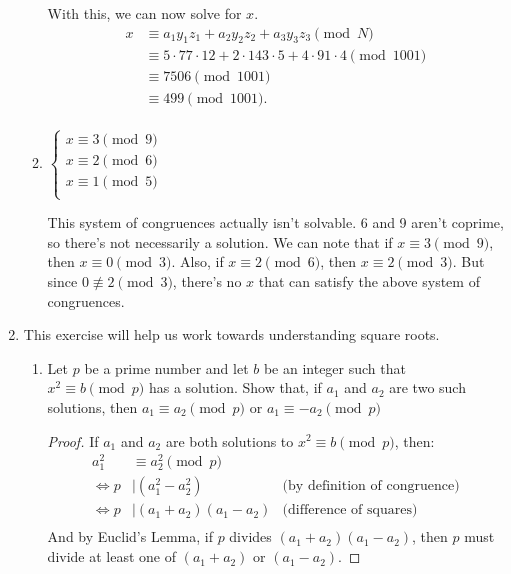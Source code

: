 \documentclass[11pt]{article}
\newcommand{\n}{\vspace{0.5cm}}
\begin{document}
\begin{enumerate}
\begin{enumerate}
          With this, we can now solve for \(x\).
          \begin{align*}
            x &\equiv a_1y_1z_1 + a_2y_2z_2 + a_3y_3z_3 \pmod{N} \\ 
              &\equiv 5 \cdot 77 \cdot 12 + 2 \cdot 143 \cdot 5 + 4 \cdot 91 \cdot 4 \pmod{1001} \\
              &\equiv 7506 \pmod{1001} \\
              &\equiv 499 \pmod{1001}. \\
          \end{align*}

        \item \(\begin{cases}
            x \equiv 3 \pmod{9} \\
            x \equiv 2 \pmod{6} \\
            x \equiv 1 \pmod{5} \\
          \end{cases}\) \n

          This system of congruences actually isn't solvable.  6 and 9 aren't coprime, so there's not necessarily a solution.  We can note that if \(x \equiv 3 \pmod 9\), then \(x \equiv 0 \pmod 3\).  Also, if \(x \equiv 2 \pmod 6\), then \(x \equiv 2 \pmod 3\).  But since \(0 \not\equiv 2 \pmod 3\), there's no \(x\) that can satisfy the above system of congruences.
      \end{enumerate}

    \item This exercise will help us work towards understanding square roots.
      \begin{enumerate}
        \item Let \(p\) be a prime number and let \(b\) be an integer such that \(x^2 \equiv b \pmod p\) has a solution.  Show that, if \(a_1\) and \(a_2\) are two such solutions, then \(a_1 \equiv a_2 \pmod p\) or \(a_1 \equiv -a_2 \pmod p\)
          \begin{proof}
            If \(a_1\) and \(a_2\) are both solutions to \(x^2 \equiv b \pmod p\), then:
            \begin{align*}
              a_1^2 &\equiv a_2^2 \pmod p \\
              \iff p &\mid (a_1^2 - a_2^2) & \text{(by definition of congruence)}\\
              \iff p &\mid (a_1 + a_2)(a_1 - a_2) & \text{(difference of squares)}\\
            \end{align*}
            And by Euclid's Lemma, if \(p\) divides \((a_1 + a_2)(a_1 - a_2)\), then \(p\) must divide at least one of \((a_1 + a_2)\) or \((a_1 - a_2)\). \n


\end{proof}
\end{enumerate}
\end{enumerate}
\end{document}
